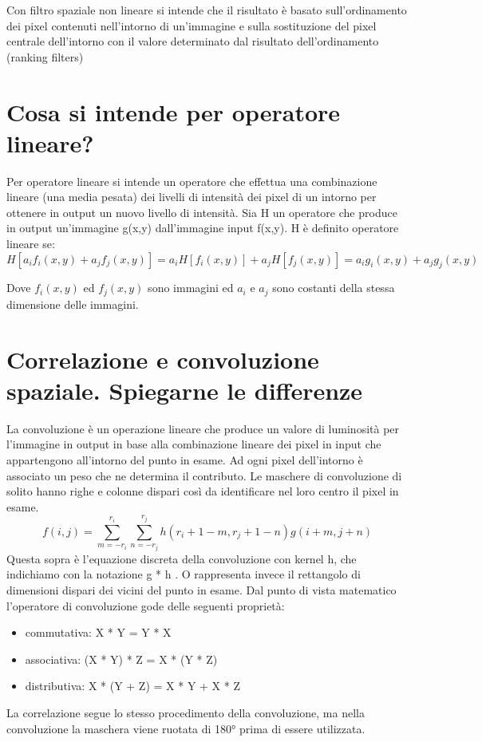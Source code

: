 Con filtro spaziale non lineare si intende che il risultato è basato sull'ordinamento dei pixel contenuti nell'intorno di un'immagine e sulla sostituzione del pixel centrale dell'intorno con il valore determinato dal risultato dell'ordinamento (ranking filters)

\section{Cosa si intende per operatore lineare?}
Per operatore lineare si intende un operatore che effettua una combinazione lineare (una media pesata) dei livelli di intensità dei pixel di un intorno per ottenere in output un nuovo livello di intensità.
Sia H un operatore che produce in output un'immagine g(x,y) dall'immagine input f(x,y). H è definito operatore lineare se:
$$
H[a_i f_i (x,y) + a_j f_j(x,y)] = a_i H[f_i(x,y)] + a_j H[f_j(x,y)] = a_i g_i(x,y) + a_j g_j(x,y)
$$

Dove $f_i(x,y)$ ed $f_j(x,y)$ sono immagini ed $a_i$ e $a_j$ sono costanti della stessa dimensione delle immagini.

\section{Correlazione e convoluzione spaziale. Spiegarne le differenze}
La convoluzione è un operazione lineare che produce un valore di luminosità per l'immagine in output in base alla combinazione lineare dei pixel in input che appartengono all'intorno del punto in esame. Ad ogni pixel dell'intorno è associato un peso che ne determina il contributo. Le maschere di convoluzione di solito hanno righe e colonne dispari così da identificare nel loro centro il pixel in esame.
$$
f(i,j) = \sum_{m=-r_i}^{r_i} \sum_{n=-r_j}^{r_j} h (r_i+1 -m, r_j+1-n) g(i+m, j+n) 
$$
Questa sopra è l'equazione discreta della convoluzione con kernel h, che indichiamo con la notazione g * h . O rappresenta invece il rettangolo di dimensioni dispari dei vicini del punto in esame. Dal punto di vista matematico l'operatore di convoluzione gode delle seguenti proprietà:
\begin{itemize}
	\item commutativa: X * Y = Y * X
	\item associativa: (X * Y) * Z =  X * (Y * Z)
	\item distributiva: X * (Y + Z) = X * Y + X * Z
\end{itemize}

La correlazione segue lo stesso procedimento della convoluzione, ma nella convoluzione la maschera viene ruotata di 180° prima di essere utilizzata.

